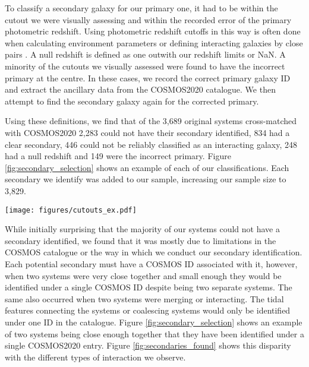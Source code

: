 \documentclass[fleqn,usenatbib]{mnras}
\begin{document}
To classify a secondary galaxy for our primary one, it had to be within the cutout we were visually assessing and within the recorded error of the primary photometric redshift. Using photometric redshift cutoffs in this way is often done when calculating environment parameters \citep[e.g][]{2006MNRAS.373..469B} or defining interacting galaxies by close pairs \citep[e.g][]{2022ApJ...940....4S}. A null redshift is defined as one outwith our redshift limits or NaN. A minority of the cutouts we visually assessed were found to have the incorrect primary at the centre. In these cases, we record the correct primary galaxy ID and extract the ancillary data from the COSMOS2020 catalogue. We then attempt to find the secondary galaxy again for the corrected primary.

Using these definitions, we find that of the 3,689 original systems cross-matched with COSMOS2020 2,283 could not have their secondary identified, 834 had a clear secondary, 446 could not be reliably classified as an interacting galaxy, 248 had a null redshift and 149 were the incorrect primary. Figure \ref{fig:secondary_selection} shows an example of each of our classifications. Each secondary we identify was added to our sample, increasing our sample size to 3,829.

\begin{figure*}
    \centering
    \texttt{[image: figures/cutouts\_ex.pdf]}
    \caption{An example of each visual classification made on the cross matched sample. From left to right these are the secondary could not be identified, the primary had a clear secondary, the primary could not be reliably classified as an interacting galaxy, the redshift was null and the incorrect primary was identified in OR+23. Based on these classifications, we either add the secondary galaxies to the sample or we remove the contamination from it. These images are 30" across using the COSMOS cutout service, selecting HST/ACS tiles as the basis for the observations in the $F814W$ filter.}
    \label{fig:secondary_selection}
\end{figure*}

While initially surprising that the majority of our systems could not have a secondary identified, we found that it was mostly due to limitations in the COSMOS catalogue or the way in which we conduct our secondary identification. Each potential secondary must have a COSMOS ID associated with it, however, when two systems were very close together and small enough they would be identified under a single COSMOS ID despite being two separate systems. The same also occurred when two systems were merging or interacting. The tidal features connecting the systems or coalescing systems would only be identified under one ID in the catalogue. Figure \ref{fig:secondary_selection} shows an example of two systems being close enough together that they have been identified under a single COSMOS2020 entry. Figure \ref{fig:secondaries_found} shows this disparity with the different types of interaction we observe.
\end{document}
